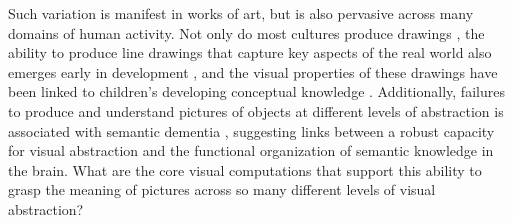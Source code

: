 \documentclass[10pt,letterpaper]{article}
\begin{document}
Such variation is manifest in works of art, but is also pervasive across many domains of human activity. 
Not only do most cultures produce drawings \cite{gombrich1995story}, the ability to produce line drawings that capture key aspects of the real world also emerges early in development \cite{karmiloff1990constraints, dillon2021rooms, long2021parallel}, and the visual properties of these drawings have been linked to children's developing conceptual knowledge \cite{tversky1989parts,huey2022developmental}. 
Additionally, failures to produce and understand pictures of objects at different levels of abstraction is associated with semantic dementia \cite{bozeat2003duck, rogers2007object}, suggesting links between a robust capacity for visual abstraction and the functional organization of semantic knowledge in the brain. 
What are the core visual computations that support this ability to grasp the meaning of pictures across so many different levels of visual abstraction? 

\end{document}
